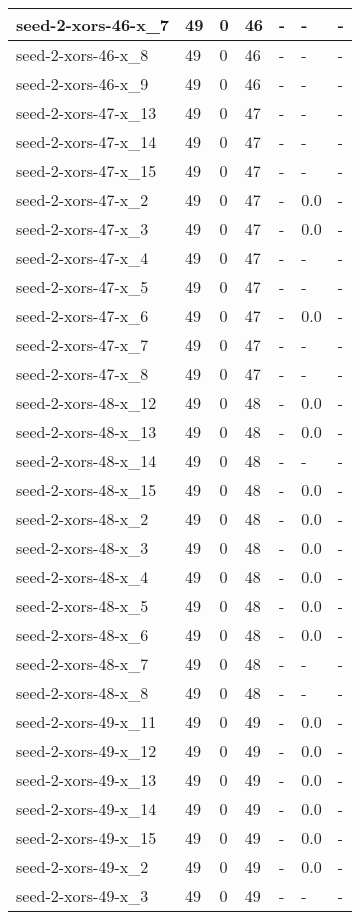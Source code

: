 \begin{scriptsize}
\begin{longtable}{|p{5cm}|l|l|l|l|l|l|}
seed-2-xors-46-x\_7&49&0&46&-&-&- \\ \hline 
seed-2-xors-46-x\_8&49&0&46&-&-&- \\ \hline 
seed-2-xors-46-x\_9&49&0&46&-&-&- \\ \hline 
seed-2-xors-47-x\_13&49&0&47&-&-&- \\ \hline 
seed-2-xors-47-x\_14&49&0&47&-&-&- \\ \hline 
seed-2-xors-47-x\_15&49&0&47&-&-&- \\ \hline 
seed-2-xors-47-x\_2&49&0&47&-&0.0&- \\ \hline 
seed-2-xors-47-x\_3&49&0&47&-&0.0&- \\ \hline 
seed-2-xors-47-x\_4&49&0&47&-&-&- \\ \hline 
seed-2-xors-47-x\_5&49&0&47&-&-&- \\ \hline 
seed-2-xors-47-x\_6&49&0&47&-&0.0&- \\ \hline 
seed-2-xors-47-x\_7&49&0&47&-&-&- \\ \hline 
seed-2-xors-47-x\_8&49&0&47&-&-&- \\ \hline 
seed-2-xors-48-x\_12&49&0&48&-&0.0&- \\ \hline 
seed-2-xors-48-x\_13&49&0&48&-&0.0&- \\ \hline 
seed-2-xors-48-x\_14&49&0&48&-&-&- \\ \hline 
seed-2-xors-48-x\_15&49&0&48&-&0.0&- \\ \hline 
seed-2-xors-48-x\_2&49&0&48&-&0.0&- \\ \hline 
seed-2-xors-48-x\_3&49&0&48&-&0.0&- \\ \hline 
seed-2-xors-48-x\_4&49&0&48&-&0.0&- \\ \hline 
seed-2-xors-48-x\_5&49&0&48&-&0.0&- \\ \hline 
seed-2-xors-48-x\_6&49&0&48&-&0.0&- \\ \hline 
seed-2-xors-48-x\_7&49&0&48&-&-&- \\ \hline 
seed-2-xors-48-x\_8&49&0&48&-&-&- \\ \hline 
seed-2-xors-49-x\_11&49&0&49&-&0.0&- \\ \hline 
seed-2-xors-49-x\_12&49&0&49&-&0.0&- \\ \hline 
seed-2-xors-49-x\_13&49&0&49&-&0.0&- \\ \hline 
seed-2-xors-49-x\_14&49&0&49&-&0.0&- \\ \hline 
seed-2-xors-49-x\_15&49&0&49&-&0.0&- \\ \hline 
seed-2-xors-49-x\_2&49&0&49&-&0.0&- \\ \hline 
seed-2-xors-49-x\_3&49&0&49&-&-&- \\ \hline 

\end{longtable}
\end{scriptsize}
